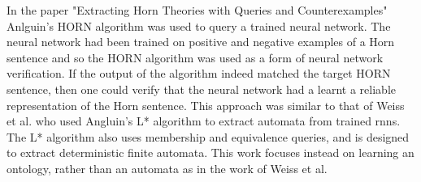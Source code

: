 In the paper "Extracting Horn Theories with Queries and Counterexamples"  Anlguin's HORN algorithm was used to query a trained neural network. The neural network had been trained on positive and negative examples of a Horn sentence and so the HORN algorithm was used as a form of neural network verification. If the output of the algorithm indeed matched the target HORN sentence, then one could verify that the neural network had a learnt a reliable representation of the Horn sentence. This approach was similar to that of Weiss et al. \cite{pmlr-v80-weiss18a, weiss2019learning} who used Angluin’s L* algorithm \cite{ANGLUIN198787} to extract automata from trained \gls{rnn}s. The L* algorithm also uses membership and equivalence queries, and is designed to extract deterministic finite automata. This work focuses instead on learning an ontology, rather than an automata as in the work of Weiss et al.